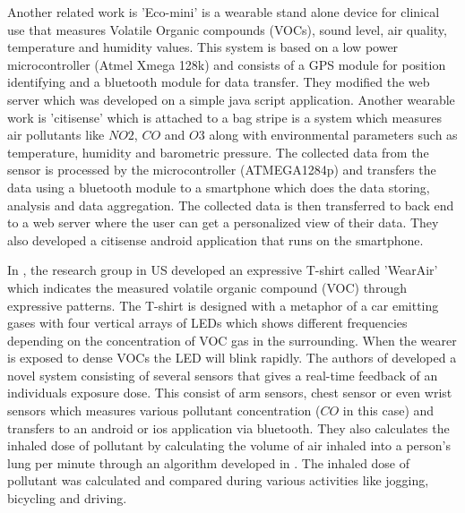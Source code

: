 Another related work is 'Eco-mini'\cite{Fletcher2015} is a wearable stand alone device for clinical use that measures Volatile Organic compounds (VOCs), sound level, air quality, temperature and humidity values. This system is based on a low power microcontroller (Atmel Xmega 128k) and consists of a GPS module for position identifying and a bluetooth module for data transfer. They modified the web server which was developed on a simple java script application. Another wearable work is 'citisense' \cite{Zappi2012} which is attached to a bag stripe is a system which measures air pollutants like $NO2$, $CO$ and  $O3$ along with environmental parameters such as temperature, humidity and barometric pressure. The collected data from the sensor is processed by the microcontroller (ATMEGA1284p) and transfers the data using a bluetooth module to a smartphone which does the data storing, analysis and data aggregation. The collected data is then transferred to back end to a web server where the user can get a personalized view of their data. They also developed a citisense android application that runs on the smartphone.
 
In \cite{Kim2010}, the research group in US developed an expressive T-shirt called 'WearAir' which indicates the measured volatile organic compound (VOC) through expressive patterns. The T-shirt is designed with a metaphor of a car emitting gases with four vertical arrays of LEDs which shows different frequencies depending on the concentration of VOC gas in the surrounding. When the wearer is exposed to dense VOCs the LED will blink rapidly. 
The authors of \cite{Hu2014} developed a novel system consisting of several sensors that gives a real-time feedback of an individuals exposure dose. This consist of arm sensors, chest sensor or even wrist sensors which measures various pollutant concentration ($CO$ in this case) and transfers to an android or ios application via bluetooth. They also calculates the inhaled dose of pollutant by calculating the volume of air inhaled into a person's lung per minute through an algorithm developed in \cite{Valli2013}. The inhaled dose of pollutant was calculated and compared  during various activities like jogging, bicycling and driving.

